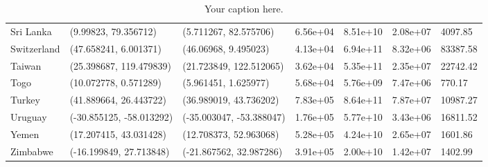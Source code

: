 \begin{table*}[h!]
\begin{tabular}{lllllll}
Sri Lanka & (9.99823, 79.356712) & (5.711267, 82.575706) & 6.56e+04 & 8.51e+10 & 2.08e+07 & 4097.85 \\
Switzerland & (47.658241, 6.001371) & (46.06968, 9.495023) & 4.13e+04 & 6.94e+11 & 8.32e+06 & 83387.58 \\
Taiwan & (25.398687, 119.479839) & (21.723849, 122.512065) & 3.62e+04 & 5.35e+11 & 2.35e+07 & 22742.42 \\
Togo & (10.072778, 0.571289) & (5.961451, 1.625977) & 5.68e+04 & 5.76e+09 & 7.47e+06 & 770.17 \\
Turkey & (41.889664, 26.443722) & (36.989019, 43.736202) & 7.83e+05 & 8.64e+11 & 7.87e+07 & 10987.27 \\
Uruguay & (-30.855125, -58.013292) & (-35.003047, -53.388047) & 1.76e+05 & 5.77e+10 & 3.43e+06 & 16811.52 \\
Yemen & (17.207415, 43.031428) & (12.708373, 52.963068) & 5.28e+05 & 4.24e+10 & 2.65e+07 & 1601.86 \\
Zimbabwe & (-16.199849, 27.713848) & (-21.867562, 32.987286) & 3.91e+05 & 2.00e+10 & 1.42e+07 & 1402.99 \\
\hline\hline\end{tabular}
\caption{Your caption here.}
\end{table*}
